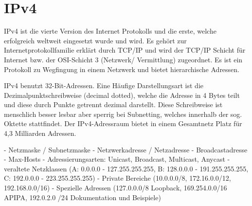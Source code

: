 \section{IPv4}

IPv4 ist die vierte Version des Internet Protokolls und die erste, welche erfolgreich weltweit eingesetzt wurde und wird. Es gehört zur Internetprotokollfamilie erklärt durch TCP/IP und wird der TCP/IP Schicht für Internet bzw. der OSI-Schicht 3 (Netzwerk/ Vermittlung) zugeordnet. Es ist ein Protokoll zu Wegfingung in einem Netzwerk und bietet hierarchische Adressen.

IPv4 benutzt 32-Bit-Adressen. Eine Häufige Darstellungsart ist die Dezimalpunktschreibweise (decimal dotted), welche die Adresse in 4 Bytes teilt und diese durch Punkte getrennt dezimal darstellt. Diese Schreibweise ist menschlich besser lesbar aber sperrig bei Subnetting, welches innerhalb der sog. Oktette stattfindet. Der IPv4-Adressraum bietet in einem Gesamtnetz Platz für 4,3 Milliarden Adressen.

- Netzmaske / Subnetzmaske
- Netzwerkadresse / Netzadresse
- Broadcastadresse
- Max-Hosts
- Adressierungsarten: Unicast, Broadcast, Multicast, Anycast
- veraltete Netzklassen (A: 0.0.0.0 - 127.255.255.255, B: 128.0.0.0 - 191.255.255.255, C: 192.0.0.0 - 223.255.255.255)
- Private Bereiche (10.0.0.0/8, 172.16.0.0/12, 192.168.0.0/16)
- Spezielle Adressen (127.0.0.0/8 Loopback, 169.254.0.0/16 APIPA, 192.0.2.0 /24 Dokumentation und Beispiele)